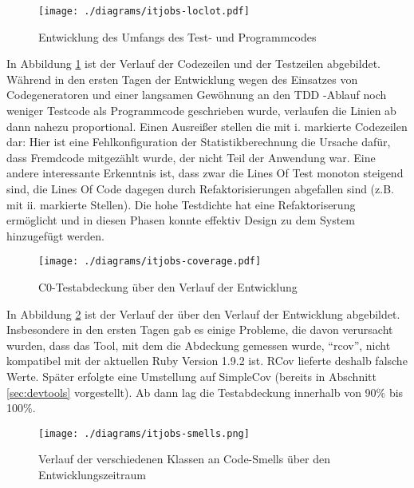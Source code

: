 \begin{figure}[htbp]
 \centering
 \texttt{[image: ./diagrams/itjobs-loclot.pdf]}
 \caption{Entwicklung des Umfangs des Test- und Programmcodes}
 \label{fig:itjobsLoc}
\end{figure}

In Abbildung \ref{fig:itjobsLoc} ist der Verlauf der Codezeilen und der Testzeilen abgebildet. Während in den ersten Tagen der Entwicklung wegen des Einsatzes von Codegeneratoren und einer langsamen Gewöhnung an den TDD -Ablauf noch weniger Testcode als Programmcode geschrieben wurde, verlaufen die Linien ab dann nahezu proportional. Einen Ausreißer stellen die mit i. markierte Codezeilen dar: Hier ist eine Fehlkonfiguration der Statistikberechnung die Ursache dafür, dass Fremdcode mitgezählt wurde, der nicht Teil der Anwendung war. Eine andere interessante Erkenntnis ist, dass zwar die Lines Of Test monoton steigend sind, die Lines Of Code dagegen durch Refaktorisierungen abgefallen sind (z.B. mit ii. markierte Stellen). Die hohe Testdichte hat eine Refaktoriserung ermöglicht und in diesen Phasen konnte effektiv Design zu dem System hinzugefügt werden.


\begin{figure}[htbp]
 \centering
 \texttt{[image: ./diagrams/itjobs-coverage.pdf]}
 \caption{C0-Testabdeckung über den Verlauf der Entwicklung}
 \label{fig:itjobsCoverage}
\end{figure}
In Abbildung \ref{fig:itjobsCoverage} ist der Verlauf der  über den Verlauf der Entwicklung abgebildet. Insbesondere in den ersten Tagen gab es einige Probleme, die davon verursacht wurden, dass das Tool, mit dem die Abdeckung gemessen wurde, "`rcov"', nicht kompatibel mit der aktuellen Ruby Version 1.9.2 ist. RCov lieferte deshalb falsche Werte. Später erfolgte eine Umstellung auf SimpleCov (bereits in Abschnitt \ref{sec:devtools} vorgestellt). Ab dann lag die Testabdeckung innerhalb von 90\% bis 100\%.

\begin{figure}[htbp]
 \centering
 \texttt{[image: ./diagrams/itjobs-smells.png]}
 \caption{Verlauf der verschiedenen Klassen an Code-Smells über den Entwicklungszeitraum}
 \label{fig:itjobsSmells}
\end{figure}

